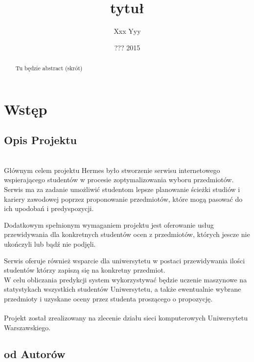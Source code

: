 \documentclass[licencjacka]{pracamgr}
\author{Xxx Yyy}
\title{tytuł}
\date{??? 2015}
\begin{document}
\maketitle
\begin{abstract}
Tu będzie abstract (skrót)
\end{abstract}
\tableofcontents

\chapter{Wstęp}


 \section{Opis Projektu}


~\\ \indent Głównym celem projektu Hermes było stworzenie serwisu internetowego 
wspierającego studentów w procesie zoptymalizowania wyboru przedmiotów.
Serwis ma za zadanie 
umożliwić studentom lepsze planowanie ścieżki studiów i kariery zawodowej
poprzez proponowanie przedmiotów, które mogą pasować do ich upodobań i predyspozycji. 

Dodatkowym spełnionym wymaganiem projektu jest oferowanie usług przewidywania dla konkretnych studentów ocen z przedmiotów, których jescze nie ukończyli lub bądź nie podjęli.

Serwis oferuje również wsparcie dla uniwersytetu w postaci
przewidywania ilości studentów którzy zapiszą się na konkretny przedmiot. \\
\indent W celu obliczania predykcji system wykorzystywać będzie uczenie maszynowe na statystykach wszystkich studentów Uniwersytetu, a także ewentualnie wybrane przedmioty i uzyskane oceny przez studenta proszącego o propozycję. \\ \\
\indent Projekt został zrealizowany na zlecenie działu sieci komputerowych Uniwersytetu Warszawskiego.
\newpage
\section{od Autorów}
\end{document}

